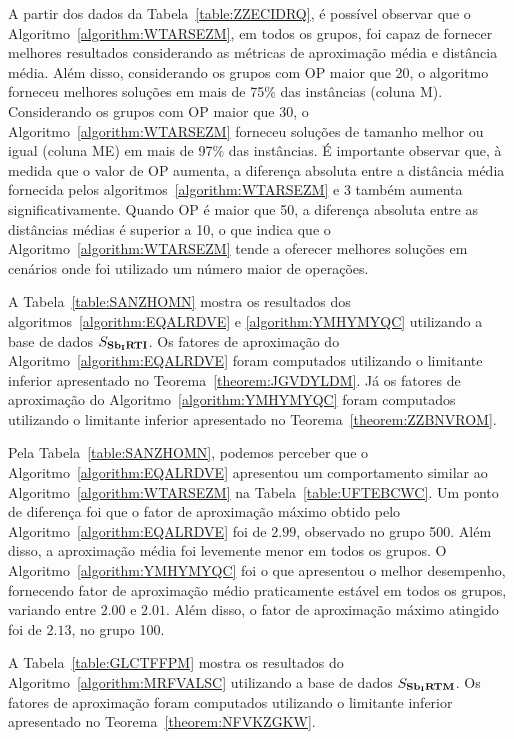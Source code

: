 

A partir dos dados da Tabela~\ref{table:ZZECIDRQ}, é possível observar que o Algoritmo~\ref{algorithm:WTARSEZM}, em todos os grupos, foi capaz de fornecer melhores resultados considerando as métricas de aproximação média e distância média. Além disso, considerando os grupos com OP maior que 20, o algoritmo forneceu melhores soluções em mais de 75\% das instâncias (coluna M). Considerando os grupos com OP maior que 30, o Algoritmo~\ref{algorithm:WTARSEZM} forneceu soluções de tamanho melhor ou igual (coluna ME) em mais de 97\% das instâncias. É importante observar que, à medida que o valor de OP aumenta, a diferença absoluta entre a distância média fornecida pelos algoritmos~\ref{algorithm:WTARSEZM} e 3\SbIRT{} também aumenta significativamente. Quando OP é maior que 50, a diferença absoluta entre as distâncias médias é superior a 10, o que indica que o Algoritmo~\ref{algorithm:WTARSEZM} tende a oferecer melhores soluções em cenários onde foi utilizado um número maior de operações.

A Tabela~\ref{table:SANZHOMN} mostra os resultados dos algoritmos~\ref{algorithm:EQALRDVE} e \ref{algorithm:YMHYMYQC} utilizando a base de dados $S_{\textbf{Sb\textsubscript{I}RTI}}{}$. Os fatores de aproximação do Algoritmo~\ref{algorithm:EQALRDVE} foram computados utilizando o limitante inferior apresentado no Teorema~\ref{theorem:JGVDYLDM}. Já os fatores de aproximação do Algoritmo~\ref{algorithm:YMHYMYQC} foram computados utilizando o limitante inferior apresentado no Teorema~\ref{theorem:ZZBNVROM}.



Pela Tabela~\ref{table:SANZHOMN}, podemos perceber que o Algoritmo~\ref{algorithm:EQALRDVE} apresentou um comportamento similar ao Algoritmo~\ref{algorithm:WTARSEZM} na Tabela~\ref{table:UFTEBCWC}. Um ponto de diferença foi que o fator de aproximação máximo obtido pelo Algoritmo~\ref{algorithm:EQALRDVE} foi de $2.99$, observado no grupo 500. Além disso, a aproximação média foi levemente menor em todos os grupos. O Algoritmo~\ref{algorithm:YMHYMYQC} foi o que apresentou o melhor desempenho, fornecendo fator de aproximação médio praticamente estável em todos os grupos, variando entre $2.00$ e $2.01$. Além disso, o fator de aproximação máximo atingido foi de $2.13$, no grupo 100.

A Tabela~\ref{table:GLCTFFPM} mostra os resultados do Algoritmo~\ref{algorithm:MRFVALSC} utilizando a base de dados $S_{\textbf{Sb\textsubscript{I}RTM}}{}$. Os fatores de aproximação foram computados utilizando o limitante inferior apresentado no Teorema~\ref{theorem:NFVKZGKW}.

